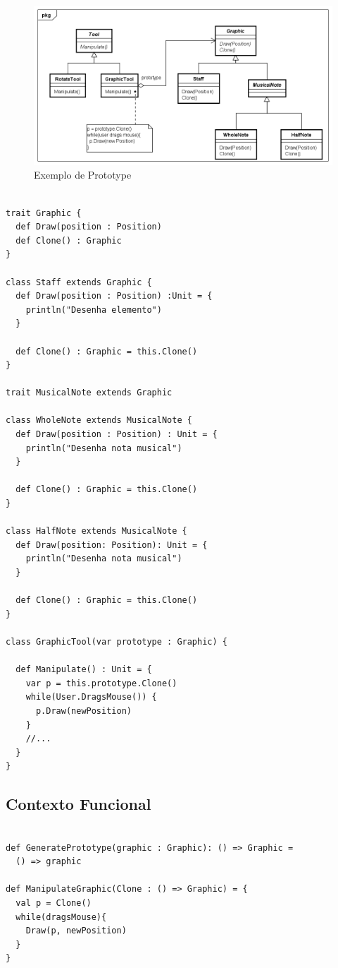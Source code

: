 \begin{figure}[htb]
	\caption{\label{prototype_exemplo}Exemplo de Prototype}
	\begin{center}
	    \includegraphics[scale=0.5]{5_padroes-contexto-funcional/5.1_criacionais/5.1.4_prototype/prototype_exemplo.png}
	\end{center}
\end{figure}

\begin{lstlisting}[caption={Prototype Orientado a Objetos},label=ooprototype]

trait Graphic {
  def Draw(position : Position)
  def Clone() : Graphic
}

class Staff extends Graphic {
  def Draw(position : Position) :Unit = {
    println("Desenha elemento")
  }

  def Clone() : Graphic = this.Clone()
}

trait MusicalNote extends Graphic

class WholeNote extends MusicalNote {
  def Draw(position : Position) : Unit = {
    println("Desenha nota musical")
  }

  def Clone() : Graphic = this.Clone()
}

class HalfNote extends MusicalNote {
  def Draw(position: Position): Unit = {
    println("Desenha nota musical")
  }

  def Clone() : Graphic = this.Clone()
}

class GraphicTool(var prototype : Graphic) {

  def Manipulate() : Unit = {
    var p = this.prototype.Clone()
    while(User.DragsMouse()) {
      p.Draw(newPosition)
    }
    //...
  }
}

\end{lstlisting}

\subsection*{Contexto Funcional}



\begin{lstlisting}[caption={Prototype Funcional},label=fpprototype]
    
def GeneratePrototype(graphic : Graphic): () => Graphic =
  () => graphic 

def ManipulateGraphic(Clone : () => Graphic) = {
  val p = Clone()
  while(dragsMouse){
    Draw(p, newPosition)
  }
}
    
\end{lstlisting}